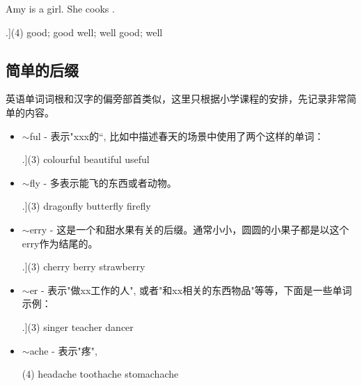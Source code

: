 \documentclass[a4paper]{article}
\begin{document}
\begin{question}
 Amy is a \blank[width=1cm]{} girl. She cooks \blank[width=1cm]{}.

 \begin{tasks}[counter-format=tsk[A].](4)
     \task good; good
     \task well; well
     \task good; well
    \end{tasks}
\end{question}

  \subsection{简单的后缀}
英语单词词根和汉字的偏旁部首类似，这里只根据小学课程的安排，先记录非常简单的内容。

\begin{itemize}
 \item $\sim$ful - 表示"xxx的“, 比如\cite{bibEngJuniorOneB}中描述春天的场景中使用了两个这样的单词： 
    \begin{tasks}[counter-format=tsk[1].](3)
      \task colourful  \task beautiful \task useful
    \end{tasks}

 \item $\sim$fly - 多表示能飞的东西或者动物。
   \begin{tasks}[counter-format=tsk[1].](3)
      \task dragonfly  \task butterfly  \task firefly
    \end{tasks}

 \item $\sim$erry - 这是一个和甜水果有关的后缀。通常小小，圆圆的小果子都是以这个erry作为结尾的。

   \begin{tasks}[counter-format=tsk[1].](3)
      \task cherry  \task berry \task strawberry
   \end{tasks}

 \item $\sim$er - 表示"做xx工作的人", 或者"和xx相关的东西物品"等等，下面是一些单词示例：
    \begin{tasks}[counter-format=tsk[1].](3)
      \task singer  \task teacher \task dancer
   \end{tasks}

 \item $\sim$ache - 表示"疼",
    \begin{tasks}[style=enumerate, label-offset=1em, label-align=right](4)
 \task headache  \task toothache  \task stomachache
 \end{tasks}
\end{itemize}
\end{document}
